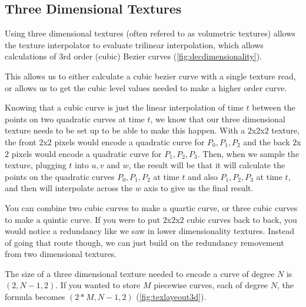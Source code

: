 \documentclass{jcgt}
\begin{document}
\subsection{Three Dimensional Textures}

Using three dimensional textures (often refered to as volumetric textures) allows the texture interpolator to evaluate trilinear interpolation, which allows calculations of 3rd order (cubic) Bezier curves (\autoref{fig:decdimensionality}).

This allows us to either calculate a cubic bezier curve with a single texture read, or allows us to get the cubic level values needed to make a higher order curve.

Knowing that a cubic curve is just the linear interpolation of time $t$ between the points on two quadratic curves at time $t$, we know that our three dimensional texture needs to be set up to be able to make this happen.  With a $2$x$2$x$2$ texture, the front $2$x$2$ pixels would encode a quadratic curve for $P_0,P_1,P_2$ and the back $2$x$2$ pixels would encode a quadratic curve for $P_1,P_2,P_3$.  Then, when we sample the texture, plugging $t$ into $u,v$ and $w$, the result will be that it will calculate the points on the quadratic curves $P_0,P_1,P_2$ at time $t$ and also $P_1,P_2,P_3$ at time $t$, and then will interpolate across the $w$ axis to give us the final result.

You can combine two cubic curves to make a quartic curve, or three cubic curves to make a quintic curve.  If you were to put $2$x$2$x$2$ cubic curves back to back, you would notice a redundancy like we saw in lower dimensionality textures.  Instead of going that route though, we can just build on the redundancy removement from two dimensional textures.

The size of a three dimensional texture needed to encode a curve of degree $N$ is $(2,N-1,2)$.  If you wanted to store $M$ piecewise curves, each of degree $N$, the formula becomes $(2*M,N-1,2)$ (\autoref{fig:texlayeout3d}).
\end{document}
